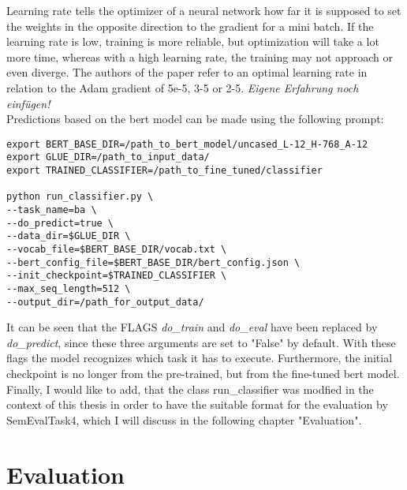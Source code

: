 \documentclass[a4paper, 11pt,titlepage,oneside,openany]{book}
\begin{document}
\noindent Learning rate tells the optimizer of a neural network how far it is supposed to set the weights in the opposite direction to the gradient for a mini batch. If the learning rate is low, training is more reliable, but  optimization will take a lot more time, whereas with a high learning rate, the training may not approach or even diverge. The authors of the paper refer to an optimal learning rate in relation to the Adam gradient \cite{adam} of 5e-5, 3-5 or 2-5. \textit{Eigene Erfahrung noch einfügen!}\\

\noindent Predictions based on the \gls{bert} model can be made using the following prompt:
\begin{lstlisting}
export BERT_BASE_DIR=/path_to_bert_model/uncased_L-12_H-768_A-12
export GLUE_DIR=/path_to_input_data/
export TRAINED_CLASSIFIER=/path_to_fine_tuned/classifier

python run_classifier.py \
--task_name=ba \
--do_predict=true \
--data_dir=$GLUE_DIR \
--vocab_file=$BERT_BASE_DIR/vocab.txt \
--bert_config_file=$BERT_BASE_DIR/bert_config.json \
--init_checkpoint=$TRAINED_CLASSIFIER \
--max_seq_length=512 \
--output_dir=/path_for_output_data/
\end{lstlisting}
\noindent It can be seen that the FLAGS \textit{do\_train} and \textit{do\_eval} have been replaced by \textit{do\_predict}, since these three arguments are set to "False" by default. With these flags the model recognizes which task it has to execute. Furthermore, the initial checkpoint is no longer from the pre-trained, but from the fine-tuned \gls{bert} model. \\
\noindent Finally, I would like to add, that the class run\_classifier was modfied in the context of this thesis in order to have the suitable format for the evaluation by SemEvalTask4, which I will discuss in the following chapter "Evaluation".


\chapter{Evaluation}
\end{document}
